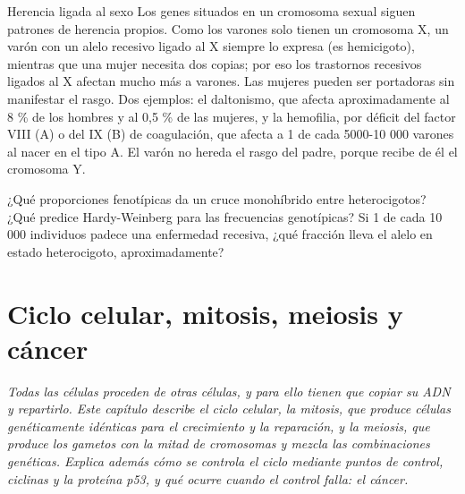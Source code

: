\documentclass{book}
\begin{document}
\begin{tcolorbox}[title={Autoficha}, studiumcheck, breakable]

Herencia ligada al sexo
Los genes situados en un cromosoma sexual siguen patrones de herencia propios. Como los varones solo tienen un cromosoma X, un varón con un alelo recesivo ligado al X siempre lo expresa (es hemicigoto), mientras que una mujer necesita dos copias; por eso los trastornos recesivos ligados al X afectan mucho más a varones. Las mujeres pueden ser portadoras sin manifestar el rasgo. Dos ejemplos: el daltonismo, que afecta aproximadamente al 8 \% de los hombres y al 0,5 \% de las mujeres, y la hemofilia, por déficit del factor VIII (A) o del IX (B) de coagulación, que afecta a 1 de cada 5000-10 000 varones al nacer en el tipo A. El varón no hereda el rasgo del padre, porque recibe de él el cromosoma Y.


¿Qué proporciones fenotípicas da un cruce monohíbrido entre heterocigotos? ¿Qué predice Hardy-Weinberg para las frecuencias genotípicas? Si 1 de cada 10 000 individuos padece una enfermedad recesiva, ¿qué fracción lleva el alelo en estado heterocigoto, aproximadamente?

\end{tcolorbox}

\chapter{Ciclo celular, mitosis, meiosis y cáncer}
\label{chap:bio-07}

\noindent\textit{Todas las células proceden de otras células, y para ello tienen que copiar su ADN y repartirlo. Este capítulo describe el ciclo celular, la mitosis, que produce células genéticamente idénticas para el crecimiento y la reparación, y la meiosis, que produce los gametos con la mitad de cromosomas y mezcla las combinaciones genéticas. Explica además cómo se controla el ciclo mediante puntos de control, ciclinas y la proteína p53, y qué ocurre cuando el control falla: el cáncer.}

\end{document}
